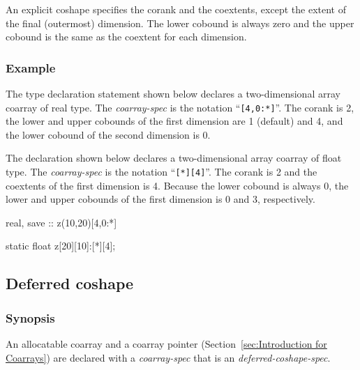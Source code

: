 {\onlyC}
An explicit coshape specifies the corank and the coextents,
except the extent of the final (outermost) dimension.
The lower cobound is always zero and the upper cobound is the same as 
the coextent for each dimension.



\subsubsection*{Example}

{\onlyF} The type declaration statement shown below declares a 
two-dimensional array coarray of real type. 
The {\it coarray-spec} is the notation ``{\tt [4,0:*]}''.
The corank is 2, the lower and upper cobounds of the first dimension 
are 1 (default) and 4, and the lower cobound of the second dimension is 0.

{\onlyC} The declaration shown below declares a two-dimensional array
coarray of float type. 
The {\it coarray-spec} is the notation ``{\tt [*][4]}''.
The corank is 2 and the coextents of the first dimension is 4.
Because the lower cobound is always 0, the lower and upper cobounds of 
the first dimension is 0 and 3, respectively.

\begin{center}
 \begin{minipage}{0.48\hsize}
  \begin{XFexample}
  real, save :: z(10,20)[4,0:*]
  \end{XFexample}
 \end{minipage}
%
 \begin{minipage}{0.48\hsize}
  \begin{XCexampleR}
  static float z[20][10]:[*][4];
  \end{XCexampleR}
 \end{minipage}
\end{center}


\subsection{Deferred coshape}
\label{sec:Deferred coshape}

\subsubsection*{Synopsis}

An allocatable coarray and a coarray pointer 
(Section~\ref{sec:Introduction for Coarrays}) are declared with 
a {\it coarray-spec} that is an {\it deferred-coshape-spec}.


